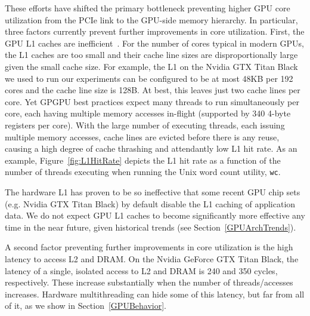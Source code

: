 These efforts have shifted the primary bottleneck preventing higher GPU core utilization from the PCIe link to the GPU-side memory hierarchy.
In particular, three factors currently prevent further improvements in core utilization.
First, the GPU L1 caches are inefficient~\cite{jia2012characterizing}. %
For the number of cores typical in modern GPUs, the L1 caches are too small and their cache line sizes are disproportionally large given the small cache size.
For example,  the L1 on the Nvidia GTX Titan Black we used to run our experiments can be configured to be at most 48KB per 192 cores and the cache line size is 128B.
At best, this leaves just two cache lines per core. 
Yet GPGPU best practices expect many threads to run simultaneously per core, each having multiple memory accesses in-flight (supported by 340 4-byte registers per core).
With the large number of executing threads, each issuing multiple memory accesses, cache lines are evicted before there is any reuse, causing a high degree of cache thrashing and attendantly low L1 hit rate.
As an example, Figure~\ref{fig:L1HitRate} depicts the L1 hit rate as a function of the number of
threads executing when running the Unix word count utility, \texttt{wc}.

The hardware L1 has proven to be so ineffective that some recent GPU chip sets (e.g. Nvidia GTX Titan Black)
by default disable the L1 caching of application data.
We do not expect GPU L1 caches to become significantly more effective any time in the near future, given historical trends (see Section~\ref{GPUArchTrends}).

A second factor preventing further improvements in core utilization is the high latency to access L2 and  DRAM. 
On the Nvidia GeForce GTX Titan Black, the latency of a single, isolated access to L2 and DRAM is 240 and 350 cycles, respectively. These
increase substantially when the number of threads/accesses increases.
Hardware multithreading can hide some of this latency, but far from all of it, as we show in Section~\ref{GPUBehavior}.

